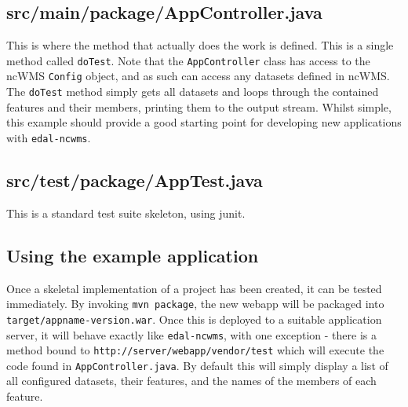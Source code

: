 \documentclass[a4paper]{article}
\begin{document}
\subsection{src/main/package/AppController.java}
This is where the method that actually does the work is defined.  This is a
single method called {\tt doTest}.  Note that the {\tt AppController} class has
access to the ncWMS {\tt Config} object, and as such can access any datasets
defined in ncWMS.  The {\tt doTest} method simply gets all datasets and loops
through the contained features and their members, printing them to the output
stream.  Whilst simple, this example should provide a good starting point for
developing new applications with {\tt edal-ncwms}.

\subsection{src/test/package/AppTest.java}
This is a standard test suite skeleton, using junit. 

\subsection{Using the example application}
Once a skeletal implementation of a project has been created, it can be tested
immediately.  By invoking {\tt mvn package}, the new webapp will be packaged
into {\tt target/appname-version.war}.  Once this is deployed to a suitable
application server, it will behave exactly like {\tt edal-ncwms}, with one
exception - there is a method bound to {\tt http://server/webapp/vendor/test}
which will execute the code found in {\tt AppController.java}.  By default this
will simply display a list of all configured datasets, their features, and the
names of the members of each feature.
\end{document}
